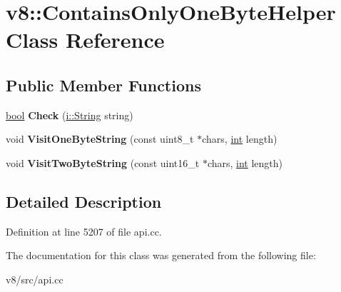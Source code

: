 \hypertarget{classv8_1_1ContainsOnlyOneByteHelper}{}\section{v8\+:\+:Contains\+Only\+One\+Byte\+Helper Class Reference}
\label{classv8_1_1ContainsOnlyOneByteHelper}
\subsection*{Public Member Functions}
\begin{DoxyCompactItemize}
\item 
\mbox{\label{classv8_1_1ContainsOnlyOneByteHelper_aef3ce73b7e0a4c62f30c6fe5c0cd6ad1}} 
\mbox{\hyperlink{classbool}{bool}} {\bfseries Check} (\mbox{\hyperlink{classv8_1_1internal_1_1String}{i\+::\+String}} string)
\item 
\mbox{\label{classv8_1_1ContainsOnlyOneByteHelper_a0dce1e691846cc44ad0e03c69297cd65}} 
void {\bfseries Visit\+One\+Byte\+String} (const uint8\+\_\+t $\ast$chars, \mbox{\hyperlink{classint}{int}} length)
\item 
\mbox{\label{classv8_1_1ContainsOnlyOneByteHelper_a2ce6fa752fda1b8cb58c00e32a5bae70}} 
void {\bfseries Visit\+Two\+Byte\+String} (const uint16\+\_\+t $\ast$chars, \mbox{\hyperlink{classint}{int}} length)
\end{DoxyCompactItemize}


\subsection{Detailed Description}


Definition at line 5207 of file api.\+cc.



The documentation for this class was generated from the following file\+:\begin{DoxyCompactItemize}
\item 
v8/src/api.\+cc\end{DoxyCompactItemize}
